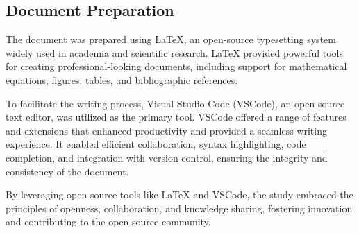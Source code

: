 \documentclass[../main.tex]{subfiles}
\begin{document}
\subsection{Document Preparation}

The document was prepared using LaTeX, an open-source typesetting system widely used in academia and scientific research. LaTeX provided powerful tools for creating professional-looking documents, including support for mathematical equations, figures, tables, and bibliographic references.

To facilitate the writing process, Visual Studio Code (VSCode), an open-source text editor, was utilized as the primary tool. VSCode offered a range of features and extensions that enhanced productivity and provided a seamless writing experience. It enabled efficient collaboration, syntax highlighting, code completion, and integration with version control, ensuring the integrity and consistency of the document.

By leveraging open-source tools like LaTeX and VSCode, the study embraced the principles of openness, collaboration, and knowledge sharing, fostering innovation and contributing to the open-source community.
\end{document}
